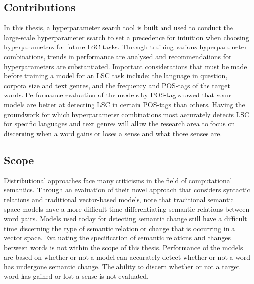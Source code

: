 \subsection{Contributions}
In this thesis, a hyperparameter search tool is built and used to conduct the large-scale hyperparameter search to set a precedence for intuition when choosing hyperparameters for future LSC tasks. Through training various hyperparameter combinations, trends in performance are analysed and recommendations for hyperparameters are substantiated. Important considerations that must be made before training a model for an LSC task include: the language in question, corpora size and text genres, and the frequency and POS-tags of the target words. Performance evaluation of the models by POS-tag showed that some models are better at detecting LSC in certain POS-tags than others. Having the groundwork for which hyperparameter combinations most accurately detects LSC for specific languages and text genres will allow the research area to focus on discerning when a word gains or loses a sense and what those senses are. 


\subsection{Scope}
\label{intro-scope}
Distributional approaches face many criticisms in the field of computational semantics. Through an evaluation of their novel approach that considers syntactic relations and traditional vector-based models, \citet{pado-lapata-2003-constructing} note that traditional semantic space models have a more difficult time differentiating semantic relations between word pairs. Models used today for detecting semantic change still have a difficult time discerning the type of semantic relation or change that is occurring in a vector space. Evaluating the specification of semantic relations and changes between words is not within the scope of this thesis. Performance of the models are based on whether or not a model can accurately detect whether or not a word has undergone semantic change. The ability to discern whether or not a target word has gained or lost a sense is not evaluated. 

